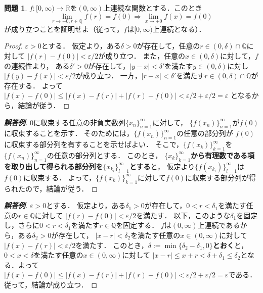 \documentclass{jsarticle}
\theoremstyle{definition}
\newtheorem{qst}{問題}
\begin{document}
\begin{qst}
$f\colon[0,\infty)\to\mathbb{R}$を$(0,\infty)$上連続な関数とする．このとき
\[ \lim_{r\to+0, r\in\mathbb{Q}}f(r)=f(0) \Rightarrow \lim_{x\to+0}f(x)=f(0) \]
が成り立つことを証明せよ（従って，$f$は$[0,\infty)$上連続となる）．
\end{qst}
\begin{proof}
$\varepsilon>0$とする．
仮定より，ある$\delta>0$が存在して，任意の$r\in(0,\delta)\cap\mathbb{Q}$に対して
$|f(r)-f(0)|<\varepsilon/2$が成り立つ．
また，任意の$x\in(0,\delta)$に対して，$f$の連続性より，
ある$\delta'>0$が存在して，$|y-x|<\delta'$を満たす$y\in(0,\delta)$に対し
$|f(y)-f(x)|<\varepsilon/2$が成り立つ．
一方，$|r-x|<\delta'$を満たす$r\in(0,\delta)\cap\mathbb{Q}$が存在する．
よって
$|f(x)-f(0)|\leq|f(x)-f(r)|+|f(r)-f(0)|<\varepsilon/2+\varepsilon/2=\varepsilon$
となるから，結論が従う．
\end{proof}
\begin{proof}[\textbf{誤答例}]
0に収束する任意の非負実数列$\{x_n\}_{n=1}^\infty$に対して，
$\{f(x_n)\}_{n=1}^\infty$が$f(0)$に収束することを示す．
そのためには，$\{f(x_n)\}_{n=1}^\infty$の任意の部分列が
$f(0)$に収束する部分列を有することを示せばよい．
そこで，$\{f(x_k)\}_{k=1}^\infty$を$\{f(x_n)\}_{n=1}^\infty$の任意の部分列とする．
このとき，
\textbf{$\{x_k\}_{k=1}^\infty$から有理数である項を取り出して得られる部分列を$\{x_{k_l}\}_{l=1}^\infty$とする}と，
仮定より$\{f(x_{k_l})\}_{l=1}^\infty$は$f(0)$に収束する．
よって，$\{f(x_k)\}_{k=1}^\infty$に対して$f(0)$に収束する部分列が得られたので，結論が従う．
\end{proof}
\begin{proof}[\textbf{誤答例}]
$\varepsilon>0$とする．
仮定より，ある$\delta_1>0$が存在して，$0<r<\delta_1$を満たす任意の$r\in\mathbb{Q}$に対して
$|f(r)-f(0)|<\varepsilon/2$を満たす．
以下，このような$\delta_1$を固定し，さらに$0<r<\delta_1$を満たす$r\in\mathbb{Q}$を固定する．
$f$は$(0,\infty)$上連続であるから，ある$\delta_2>0$が存在して，
$|x-r|<\delta_2$を満たす任意の$x\in(0,\infty)$に対して$|f(x)-f(r)|<\varepsilon/2$を満たす．
このとき，\textbf{$\delta:=\min\{\delta_2-\delta_1,0\}$とおく}と，
$0<x<\delta$を満たす任意の$x\in(0,\infty)$に対して
$|x-r|\leq x+r<\delta+\delta_1\leq\delta_2$となる．よって
$|f(x)-f(0)|\leq|f(x)-f(r)|+|f(r)-f(0)|<\varepsilon/2+\varepsilon/2=\varepsilon$である．
従って，結論が成り立つ．
\end{proof}
\end{document}
